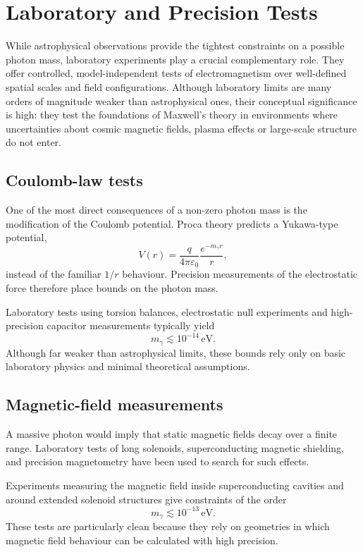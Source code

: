 \section{Laboratory and Precision Tests}

While astrophysical observations provide the tightest constraints on a 
possible photon mass, laboratory experiments play a crucial complementary 
role. They offer controlled, model-independent tests of electromagnetism 
over well-defined spatial scales and field configurations. Although 
laboratory limits are many orders of magnitude weaker than astrophysical 
ones, their conceptual significance is high: they test the foundations of 
Maxwell’s theory in environments where uncertainties about cosmic magnetic 
fields, plasma effects or large-scale structure do not enter.

\subsection*{Coulomb-law tests}

One of the most direct consequences of a non-zero photon mass is the 
modification of the Coulomb potential. Proca theory predicts a Yukawa-type 
potential,
\[
V(r) = \frac{q}{4\pi\varepsilon_0} \frac{e^{-m_\gamma r}}{r},
\]
instead of the familiar $1/r$ behaviour. Precision measurements of the 
electrostatic force therefore place bounds on the photon mass.

Laboratory tests using torsion balances, electrostatic null experiments and 
high-precision capacitor measurements typically yield
\[
m_\gamma \lesssim 10^{-14}\,\text{eV}.
\]
Although far weaker than astrophysical limits, these bounds rely only on 
basic laboratory physics and minimal theoretical assumptions.

\subsection*{Magnetic-field measurements}

A massive photon would imply that static magnetic fields decay over a 
finite range. Laboratory tests of long solenoids, superconducting magnetic 
shielding, and precision magnetometry have been used to search for such 
effects.

Experiments measuring the magnetic field inside superconducting cavities 
and around extended solenoid structures give constraints of the order
\[
m_\gamma \lesssim 10^{-13}\,\text{eV}.
\]
These tests are particularly clean because they rely on geometries in which 
magnetic field behaviour can be calculated with high precision.

